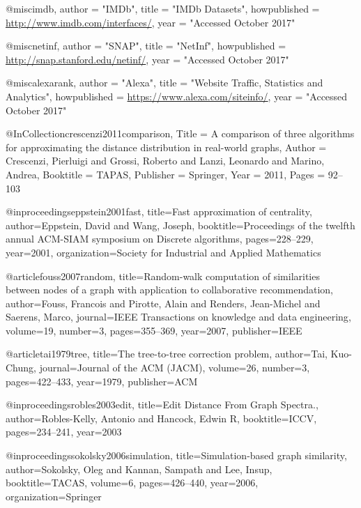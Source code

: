 @misc{imdb,
    author = "IMDb",
    title = "IMDb Datasets",
    howpublished = {\url{http://www.imdb.com/interfaces/}},
    year = "Accessed October 2017" 
}


@misc{netinf,
    author = "SNAP",
    title = "NetInf",
    howpublished = {\url{http://snap.stanford.edu/netinf/}},
    year = "Accessed October 2017" 
}


@misc{alexarank,
    author = "Alexa",
    title = "Website Traffic, Statistics and Analytics",
    howpublished = {\url{https://www.alexa.com/siteinfo/}},
    year = "Accessed October 2017" 
}

@InCollection{crescenzi2011comparison,
  Title                    = {A comparison of three algorithms for approximating the distance distribution in real-world graphs},
  Author                   = {Crescenzi, Pierluigi and Grossi, Roberto and Lanzi, Leonardo and Marino, Andrea},
  Booktitle                = {TAPAS},
  Publisher                = {Springer},
  Year                     = {2011},
  Pages                    = {92--103}
}

@inproceedings{eppstein2001fast,
  title={Fast approximation of centrality},
  author={Eppstein, David and Wang, Joseph},
  booktitle={Proceedings of the twelfth annual ACM-SIAM symposium on Discrete algorithms},
  pages={228--229},
  year={2001},
  organization={Society for Industrial and Applied Mathematics}
}

@article{fouss2007random,
  title={Random-walk computation of similarities between nodes of a graph with application to collaborative recommendation},
  author={Fouss, Francois and Pirotte, Alain and Renders, Jean-Michel and Saerens, Marco},
  journal={IEEE Transactions on knowledge and data engineering},
  volume={19},
  number={3},
  pages={355--369},
  year={2007},
  publisher={IEEE}
}

@article{tai1979tree,
  title={The tree-to-tree correction problem},
  author={Tai, Kuo-Chung},
  journal={Journal of the ACM (JACM)},
  volume={26},
  number={3},
  pages={422--433},
  year={1979},
  publisher={ACM}
}

@inproceedings{robles2003edit,
  title={Edit Distance From Graph Spectra.},
  author={Robles-Kelly, Antonio and Hancock, Edwin R},
  booktitle={ICCV},
  pages={234--241},
  year={2003}
}

@inproceedings{sokolsky2006simulation,
  title={Simulation-based graph similarity},
  author={Sokolsky, Oleg and Kannan, Sampath and Lee, Insup},
  booktitle={TACAS},
  volume={6},
  pages={426--440},
  year={2006},
  organization={Springer}
}

